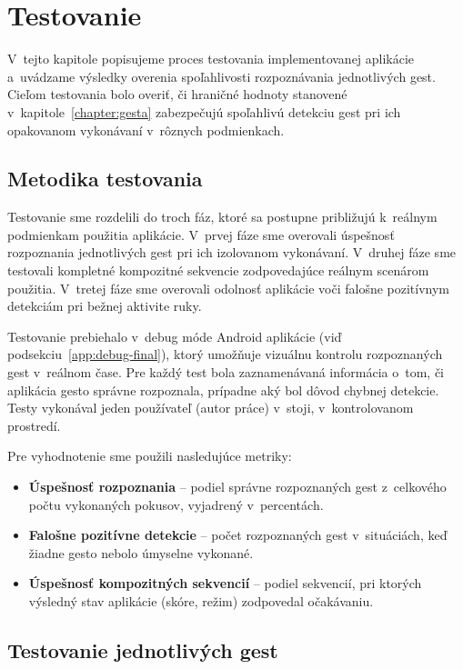 \section{Testovanie}
\label{chapter:testovanie}

V~tejto kapitole popisujeme proces testovania
implementovanej aplikácie a~uvádzame výsledky
overenia spoľahlivosti rozpoznávania jednotlivých
gest. Cieľom testovania bolo overiť, či hraničné
hodnoty stanovené v~kapitole~\ref{chapter:gesta}
zabezpečujú spoľahlivú detekciu gest pri ich
opakovanom vykonávaní v~rôznych podmienkach.

\subsection{Metodika testovania}

Testovanie sme rozdelili do troch fáz, ktoré sa
postupne približujú k~reálnym podmienkam použitia
aplikácie. V~prvej fáze sme overovali úspešnosť
rozpoznania jednotlivých gest pri ich izolovanom
vykonávaní. V~druhej fáze sme testovali kompletné
kompozitné sekvencie zodpovedajúce reálnym scenárom
použitia. V~tretej fáze sme overovali odolnosť
aplikácie voči falošne pozitívnym detekciám
pri bežnej aktivite ruky.

Testovanie prebiehalo v~debug móde Android aplikácie
(viď podsekciu~\ref{app:debug-final}), ktorý umožňuje
vizuálnu kontrolu rozpoznaných gest v~reálnom čase.
Pre každý test bola zaznamenávaná informácia o~tom,
či aplikácia gesto správne rozpoznala, prípadne aký
bol dôvod chybnej detekcie. Testy vykonával jeden
používateľ (autor práce) v~stoji, v~kontrolovanom
prostredí.

Pre vyhodnotenie sme použili nasledujúce metriky:
\begin{itemize}
  \item \textbf{Úspešnosť rozpoznania} -- podiel správne
        rozpoznaných gest z~celkového počtu vykonaných
        pokusov, vyjadrený v~percentách.
  \item \textbf{Falošne pozitívne detekcie} -- počet
        rozpoznaných gest v~situáciách, keď žiadne gesto
        nebolo úmyselne vykonané.
  \item \textbf{Úspešnosť kompozitných sekvencií} -- podiel
        sekvencií, pri ktorých výsledný stav aplikácie
        (skóre, režim) zodpovedal očakávaniu.
\end{itemize}

\subsection{Testovanie jednotlivých gest}
\label{subsec:test-jednotlive}

